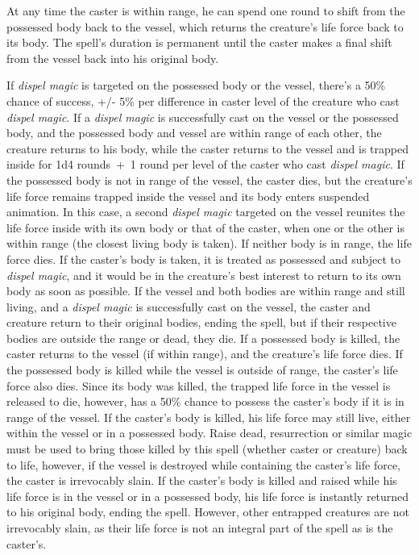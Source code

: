 \begin{multicols}{2}
At any time the caster is within range, he can spend one round to shift from the possessed body back to the vessel, which returns the creature's life force back to its body.  The spell's duration is permanent until the caster makes a final shift from the vessel back into his original body.

If \textit{dispel magic} is targeted on the possessed body or the vessel, there's a 50\% chance of success, +/- 5\% per difference in caster level of the creature who cast \textit{dispel magic}.  If a \textit{dispel magic} is successfully cast on the vessel or the possessed body, and the possessed body and vessel are within range of each other, the creature returns to his body, while the caster returns to the vessel and is trapped inside for 1d4 rounds~+~1 round per level of the caster who cast \textit{dispel magic}.  If the possessed body is not in range of the vessel, the caster dies, but the creature's life force remains trapped inside the vessel and its body enters suspended animation.  In this case, a second \textit{dispel magic} targeted on the vessel reunites the life force inside with its own body or that of the caster, when one or the other is within range (the closest living body is taken).  If neither body is in range, the life force dies.  If the caster's body is taken, it is treated as possessed and subject to \textit{dispel magic}, and it would be in the creature's best interest to return to its own body as soon as possible.  If the vessel and both bodies are within range and still living, and a \textit{dispel magic} is successfully cast on the vessel, the caster and creature return to their original bodies, ending the spell, but if their respective bodies are outside the range or dead, they die.  If a possessed body is killed, the caster returns to the vessel (if within range), and the creature's life force dies.  If the possessed body is killed while the vessel is outside of range, the caster's life force also dies.  Since its body was killed, the trapped life force in the vessel is released to die, however, has a 50\% chance to possess the caster's body if it is in range of the vessel.  If the caster's body is killed, his life force may still live, either within the vessel or in a possessed body.   Raise dead, resurrection or similar magic must be used to bring those killed by this spell (whether caster or creature) back to life, however, if the vessel is destroyed while containing the caster's life force, the caster is irrevocably slain.  If the caster's body is killed and raised while his life force is in the vessel or in a possessed body, his life force is instantly returned to his original body, ending the spell.  However, other entrapped creatures are not irrevocably slain, as their life force is not an integral part of the spell as is the caster's.


\end{multicols}
